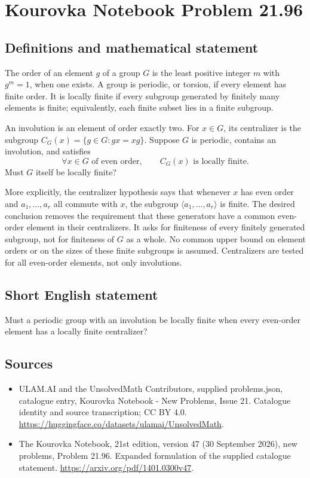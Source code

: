 \documentclass[11pt,a4paper]{article}
\begin{document}
\section*{Kourovka Notebook Problem 21.96}\label{statement}

\subsection{Definitions and mathematical statement}
The order of an element $g$ of a group $G$ is the least positive integer $m$ with $g^m=1$, when one exists. A group is periodic, or torsion, if every element has finite order. It is locally finite if every subgroup generated by finitely many elements is finite; equivalently, each finite subset lies in a finite subgroup.

An involution is an element of order exactly two. For $x\in G$, its centralizer is the subgroup $C_G(x)=\{g\in G:gx=xg\}$. Suppose $G$ is periodic, contains an involution, and satisfies
\[
 \forall x\in G\text{ of even order},\qquad
 C_G(x)\text{ is locally finite}.
\]
Must $G$ itself be locally finite?

More explicitly, the centralizer hypothesis says that whenever $x$ has even order and $a_1,\ldots,a_r$ all commute with $x$, the subgroup $\langle a_1,\ldots,a_r\rangle$ is finite. The desired conclusion removes the requirement that these generators have a common even-order element in their centralizers. It asks for finiteness of every finitely generated subgroup, not for finiteness of $G$ as a whole. No common upper bound on element orders or on the sizes of these finite subgroups is assumed. Centralizers are tested for all even-order elements, not only involutions.
\subsection{Short English statement}
Must a periodic group with an involution be locally finite when every even-order element has a locally finite centralizer?
\subsection{Sources}
\begin{itemize}
\item[S1] ULAM.AI and the UnsolvedMath Contributors, supplied problems.json, catalogue entry, Kourovka Notebook - New Problems, Issue 21. Catalogue identity and source transcription; CC BY 4.0.
\url{https://huggingface.co/datasets/ulamai/UnsolvedMath}.
\item[S2] The Kourovka Notebook, 21st edition, version 47 (30 September 2026), new problems, Problem 21.96. Expanded formulation of the supplied catalogue statement.
\url{https://arxiv.org/pdf/1401.0300v47}.
\end{itemize}
\end{document}
